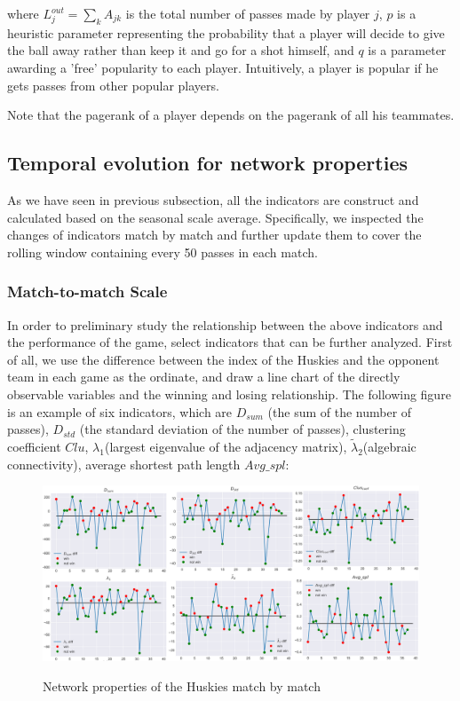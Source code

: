 \documentclass{mcmthesis}
\begin{document}
where $L^{out}_j = \sum_kA_{jk}$ is the total number of passes made by player $j$, $p$ is a heuristic parameter representing the probability that a player will decide to give the ball away rather than keep it and go for a shot himself, and $q$ is a parameter awarding a 'free' popularity to each player. Intuitively, a player is popular if he gets passes from other popular players.

Note that the pagerank of a player depends on the pagerank of all his teammates.

\subsection{Temporal evolution for network properties}

As we have seen in previous subsection, all the indicators are construct and calculated based on the seasonal scale average. Specifically, we inspected the changes of indicators match by match and further update them to cover the rolling window containing every 50 passes in each match. 

\subsubsection{Match-to-match Scale}
In order to preliminary study the relationship between the above indicators and the performance of the game, select indicators that can be further analyzed. First of all, we use the difference between the index of the Huskies and the opponent team in each game as the ordinate, and draw a line chart of the directly observable variables and the winning and losing relationship. The following figure is an example of six indicators, which are $D_{sum}$ (the sum of the number of passes), $D_{std}$ (the standard deviation of the number of passes), clustering coefficient $Clu$, $\lambda_1$(largest eigenvalue of the adjacency matrix), $\tilde\lambda_2$(algebraic connectivity), average shortest path length $Avg\_spl$:
\begin{figure}[htbp]
  \centering
  \caption{Network properties of the Huskies match by match}
  \includegraphics[width=15cm]{mtom.png}
  \label{match}
\end{figure}
\end{document}
